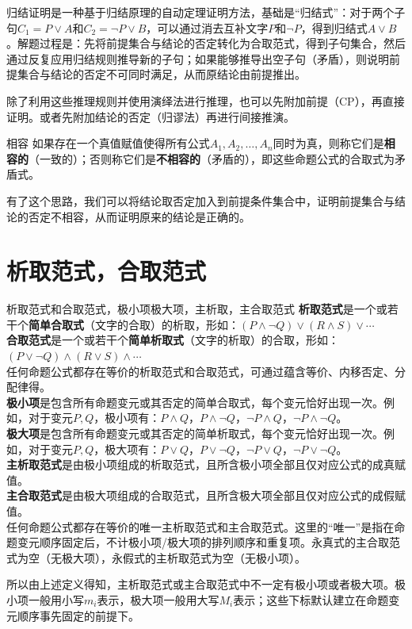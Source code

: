 归结证明是一种基于归结原理的自动定理证明方法，基础是“归结式”：对于两个子句$C_1 = P \lor A$和$C_2 = \neg P \lor B$，可以通过消去互补文字$P$和$\neg P$，得到归结式$A \lor B$。解题过程是：先将前提集合与结论的否定转化为合取范式，得到子句集合，然后通过反复应用归结规则推导新的子句；如果能够推导出空子句（矛盾），则说明前提集合与结论的否定不可同时满足，从而原结论由前提推出。

除了利用这些推理规则并使用演绎法进行推理，也可以先附加前提（CP），再直接证明。或者先附加结论的否定（归谬法）再进行间接推演。
\begin{definition}{相容}{}
    如果存在一个真值赋值使得所有公式$A_1, A_2, \ldots, A_n$同时为真，则称它们是\textbf{相容的}（一致的）；否则称它们是\textbf{不相容的}（矛盾的），即这些命题公式的合取式为矛盾式。
\end{definition}
有了这个思路，我们可以将结论取否定加入到前提条件集合中，证明前提集合与结论的否定不相容，从而证明原来的结论是正确的。
\section{析取范式，合取范式}
\begin{definition}{析取范式和合取范式，极小项极大项，主析取，主合取范式}{}
\textbf{析取范式}是一个或若干个\textbf{简单合取式}（文字的合取）的析取，形如：$(P \land \neg Q) \lor (R \land S) \lor \cdots$\\
\textbf{合取范式}是一个或若干个\textbf{简单析取式}（文字的析取）的合取，形如：$(P \lor \neg Q) \land (R \lor S) \land \cdots$\\
任何命题公式都存在等价的析取范式和合取范式，可通过蕴含等价、内移否定、分配律得。\\
\textbf{极小项}是包含所有命题变元或其否定的简单合取式，每个变元恰好出现一次。例如，对于变元$P,Q$，极小项有：$P \land Q$，$P \land \neg Q$，$\neg P \land Q$，$\neg P \land \neg Q$。\\
\textbf{极大项}是包含所有命题变元或其否定的简单析取式，每个变元恰好出现一次。例如，对于变元$P,Q$，极大项有：$P \lor Q$，$P \lor \neg Q$，$\neg P \lor Q$，$\neg P \lor \neg Q$。\\
\textbf{主析取范式}是由极小项组成的析取范式，且所含极小项全部且仅对应公式的成真赋值。\\
\textbf{主合取范式}是由极大项组成的合取范式，且所含极大项全部且仅对应公式的成假赋值。\\
任何命题公式都存在等价的唯一主析取范式和主合取范式。这里的“唯一”是指在命题变元顺序固定后，不计极小项/极大项的排列顺序和重复项。永真式的主合取范式为空（无极大项），永假式的主析取范式为空（无极小项）。
\end{definition}
所以由上述定义得知，主析取范式或主合取范式中不一定有极小项或者极大项。极小项一般用小写$m_i$表示，极大项一般用大写$M_i$表示；这些下标默认建立在命题变元顺序事先固定的前提下。

